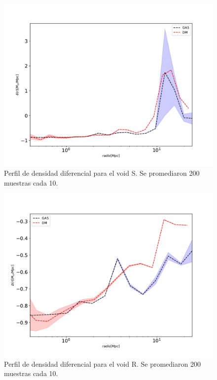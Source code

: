 \begin{figure}[h]
\centering
\includegraphics[width=15cm]{Figures/S1373_sph3.pdf}
\decoRule
\caption[asd]{Perfil de densidad diferencial para el void S. Se promediaron 200 muestras cada 10. }
\label{fig:Electron}
\end{figure}

\begin{figure}[h]
\centering
\includegraphics[width=15cm]{Figures/R1198_sph3.pdf}
\decoRule
\caption[asd]{Perfil de densidad diferencial para el void R. Se promediaron 200 muestras cada 10. }
\label{fig:Electron}
\end{figure}

